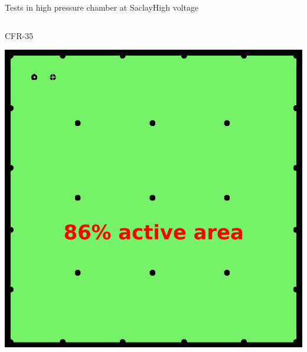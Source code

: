 \documentclass[10pt]{beamer}
\begin{document}
\begin{frame}{Tests in high pressure chamber at Saclay}{High voltage}
\begin{columns}
\begin{column}{0.5\textwidth}
    			\begin{minipage}{0.48\textwidth}
    				\centering
    				\begin{scriptsize}
	    				CFR-35
    				\end{scriptsize}
    				\includegraphics[width=.9\textwidth]{figures/666/CFR-35.png}
    			\end{minipage}
    		\end{column}
    	\end{columns}
    \end{frame}
    
\end{document}
